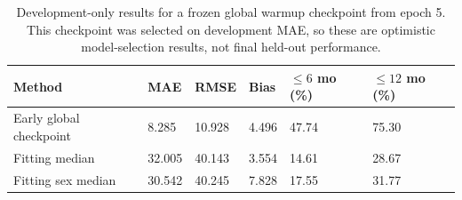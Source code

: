 \begin{table}[!t]
\centering\footnotesize
\caption{Development-only results for a frozen global warmup checkpoint from epoch 5. This checkpoint was selected on development MAE, so these are optimistic model-selection results, not final held-out performance.}
\label{tab:prelim_metrics}
\begin{tabularx}{\textwidth}{@{}p{31mm}XXXXX@{}}
\toprule
Method & MAE & RMSE & Bias & $\leq6$ mo (\%) & $\leq12$ mo (\%) \\
\midrule
Early global checkpoint & 8.285 & 10.928 & 4.496 & 47.74 & 75.30 \\
Fitting median & 32.005 & 40.143 & 3.554 & 14.61 & 28.67 \\
Fitting sex median & 30.542 & 40.245 & 7.828 & 17.55 & 31.77 \\
\bottomrule
\end{tabularx}
\end{table}